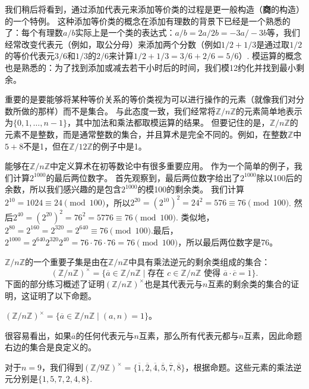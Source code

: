我们稍后将看到，通过添加代表元来添加等价类的过程是更一般构造（\textbf{商}的构造）的一个特例。
这种添加等价类的概念在添加有理数的背景下已经是一个熟悉的了：每个有理数$a/b$实际上是一个类的表达式：$a/b = 2a/2b = -3a/-3b$等，我们经常改变代表元（例如，取公分母）来添加两个分数（例如$1/2 + 1/3$是通过取$1/2$的等价代表元$3/6$和$1/3$的$2/6$来计算$1/2 + 1/3 = 3/6 + 2/6 = 5/6$）.
模运算的概念也是熟悉的：为了找到添加或减去若干小时后的时间，我们模12约化并找到最小剩余。

重要的是要能够将某种等价关系的等价类视为可以进行操作的元素（就像我们对分数所做的那样）而不是集合。
与此态度一致，我们经常将$\mathbb{Z}/n\mathbb{Z}$的元素简单地表示为$\{0, 1, \ldots, n-1\}$，其中加法和乘法都取模运算的结果。
但要记住的是，$\mathbb{Z}/n\mathbb{Z}$的元素不是整数，而是通常整数的集合，并且算术是完全不同的。例如，在整数$\mathbb{Z}$中$5 + 8$不是1，但在$\mathbb{Z}/12\mathbb{Z}$的例子中是1。

能够在$\mathbb{Z}/n\mathbb{Z}$中定义算术在初等数论中有很多重要应用。
作为一个简单的例子，我们计算$2^{1000}$的最后两位数字。
首先观察到，最后两位数字给出了$2^{1000}$除以100后的余数，所以我们感兴趣的是包含$2^{1000}$的模100的剩余类。
我们计算$2^{10} = 1024 \equiv 24 \pmod{100}$，所以$2^{20} = (2^{10})^2 = 24^2 = 576 \equiv 76 \pmod{100}$.
然后$2^{40} = (2^{20})^2 = 76^2 = 5776 \equiv 76 \pmod{100}$.
类似地，$2^{80} = 2^{160} = 2^{320} = 2^{640} \equiv 76 \pmod{100}$.最后，$2^{1000} = 2^{640}2^{320}2^{40} = 76 \cdot 76 \cdot 76 = 76 \pmod{100}$，所以最后两位数字是76。

$\mathbb{Z}/n\mathbb{Z}$的一个重要子集是由在$\mathbb{Z}/n\mathbb{Z}$中具有乘法逆元的剩余类组成的集合：
\[
(\mathbb{Z}/n\mathbb{Z})^\times = \{\overline{a} \in \mathbb{Z}/n\mathbb{Z} \mid \text{存在 } c \in \mathbb{Z}/n\mathbb{Z} \text{ 使得 } \overline{a} \cdot \overline{c} = \overline{1}\}.
\]
下面的部分练习概述了证明$(\mathbb{Z}/n\mathbb{Z})^\times$也是其代表元与$n$互素的剩余类的集合的证明，这证明了以下命题。

\begin{proposition}
\label{prop:0.3.2}
$(\mathbb{Z}/n\mathbb{Z})^\times = \{\overline{a} \in \mathbb{Z}/n\mathbb{Z} \mid (a, n) = 1\}$。
\end{proposition}

很容易看出，如果$\overline{a}$的任何代表元与$n$互素，那么所有代表元都与$n$互素，因此命题右边的集合是良定义的。

\begin{example}
对于$n = 9$，我们得到$(\mathbb{Z}/9\mathbb{Z})^\times = \{\overline{1}, \overline{2}, \overline{4}, \overline{5}, \overline{7}, \overline{8}\}$，根据命题。这些元素的乘法逆元分别是$\{1, 5, 7, 2, 4, 8\}$.
\end{example}

